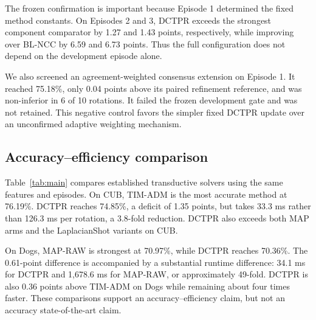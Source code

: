 \documentclass[10pt,twocolumn]{article}
\newcommand{\method}{\textsc{DCTPR}\xspace}
\begin{document}
The frozen confirmation is important because Episode 1 determined the fixed
method constants. On Episodes 2 and 3, \method exceeds the strongest component
comparator by 1.27 and 1.43 points, respectively, while improving over BL-NCC
by 6.59 and 6.73 points. Thus the full configuration does not depend on the
development episode alone.

We also screened an agreement-weighted consensus extension on Episode 1. It
reached 75.18\%, only 0.04 points above its paired refinement reference, and was
non-inferior in 6 of 10 rotations. It failed the frozen development gate and was
not retained. This negative control favors the simpler fixed \method update over
an unconfirmed adaptive weighting mechanism.

\subsection{Accuracy--efficiency comparison}

Table~\ref{tab:main} compares established transductive solvers using the same
features and episodes. On CUB, TIM-ADM is the most accurate method at 76.19\%.
\method reaches 74.85\%, a deficit of 1.35 points, but takes 33.3 ms rather
than 126.3 ms per rotation, a 3.8-fold reduction. \method also exceeds both MAP
arms and the LaplacianShot variants on CUB.

On Dogs, MAP-RAW is strongest at 70.97\%, while \method reaches 70.36\%.
The 0.61-point difference is accompanied by a substantial runtime difference:
34.1 ms for \method and 1,678.6 ms for MAP-RAW, or approximately 49-fold.
\method is also 0.36 points above TIM-ADM on Dogs while remaining about four
times faster. These comparisons support an accuracy--efficiency claim, but not
an accuracy state-of-the-art claim.
\end{document}
